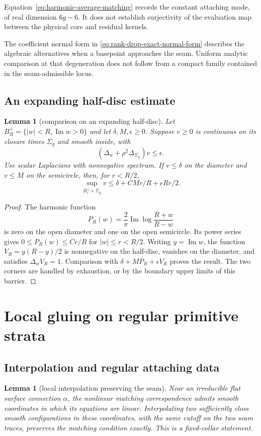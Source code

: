 \documentclass[11pt]{amsart}
\newtheorem{lemma}[theorem]{Lemma}
\theoremstyle{definition}
\theoremstyle{remark}
\theoremstyle{plain}
\begin{document}
Equation~\eqref{eq:harmonic-average-matching} records the constant
attaching mode, of real dimension $6g-6$. It does not establish
surjectivity of the evaluation map between the physical core and
residual kernels.

The coefficient normal form in
\eqref{eq:rank-drop-exact-normal-form} describes the algebraic
alternatives when a basepoint approaches the seam. Uniform analytic
comparison at that degeneration does not follow from a compact
family contained in the seam-admissible locus.

\subsection{An expanding half-disc estimate}

\begin{lemma}[comparison on an expanding half-disc]
\label{lem:expanding-boundary}
Let $B_R^+=\{|w|<R,\operatorname{Im}w>0\}$ and let
$\delta,M,\epsilon\geq0$. Suppose $v\geq0$ is
continuous on its closure times $\Sigma_g$ and smooth inside, with
\[
 (\Delta_w+\rho^2\Delta_{\Sigma_g})v\leq\epsilon.
\]
Use scalar Laplacians with nonnegative spectrum. If $v\leq\delta$ on
the diameter and $v\leq M$ on the semicircle, then, for $r<R/2$,
\[
 \sup_{B_r^+\times\Sigma_g}v
 \leq\delta+CMr/R+\epsilon Rr/2.
\]
\end{lemma}

\begin{proof}
The harmonic function
\[
 P_R(w)=\frac2\pi\operatorname{Im}\log\frac{R+w}{R-w}
\]
is zero on the open diameter and one on the open semicircle. Its power
series gives $0\leq P_R(w)\leq Cr/R$ for $|w|\leq r<R/2$.
Writing $y=\operatorname{Im}w$, the function $V_R=y(R-y)/2$ is
nonnegative on the half-disc, vanishes on the diameter, and satisfies
$\Delta_wV_R=1$. Comparison with
$\delta+MP_R+\epsilon V_R$ proves the result. The two corners are
handled by exhaustion, or by the boundary upper limits of this barrier.
\end{proof}


\section{Local gluing on regular primitive strata}
\label{sec:regular-local-gluing}

\subsection{Interpolation and regular attaching data}
\begin{lemma}[local interpolation preserving the seam]
\label{lem:seam-interpolation}
Near an irreducible flat surface connection $\alpha$, the nonlinear
matching correspondence admits smooth coordinates in which its equations
are linear. Interpolating two sufficiently close smooth configurations in
these coordinates, with the same cutoff on the two seam traces, preserves
the matching condition exactly. This is a fixed-collar statement.
\end{lemma}
\end{document}
